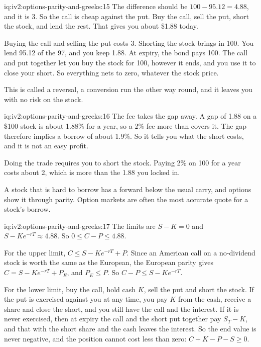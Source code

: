 \begin{solution}{iq:iv2:options-parity-and-greeks:15}
The difference should be $100 - 95.12 = 4.88$, and it is 3. So the call is cheap against the put. Buy the call, sell the put, short the stock, and lend the rest. That gives you about \$1.88 today.

Buying the call and selling the put costs 3. Shorting the stock brings in 100. You lend 95.12 of the 97, and you keep 1.88. At expiry, the bond pays 100. The call and put together let you buy the stock for 100, however it ends, and you use it to close your short. So everything nets to zero, whatever the stock price.

This is called a reversal, a conversion run the other way round, and it leaves you with no risk on the stock.

\end{solution}

\begin{solution}{iq:iv2:options-parity-and-greeks:16}
The fee takes the gap away. A gap of 1.88 on a \$100 stock is about 1.88\% for a year, so a 2\% fee more than covers it. The gap therefore implies a borrow of about 1.9\%. So it tells you what the short costs, and it is not an easy profit.

Doing the trade requires you to short the stock. Paying 2\% on 100 for a year costs about 2, which is more than the 1.88 you locked in.

A stock that is hard to borrow has a forward below the usual carry, and options show it through parity. Option markets are often the most accurate quote for a stock's borrow.

\end{solution}

\begin{solution}{iq:iv2:options-parity-and-greeks:17}
The limits are $S - K = 0$ and $S - Ke^{-rT} \approx 4.88$. So $0 \leq C - P \leq 4.88$.

For the upper limit, $C \leq S - Ke^{-rT} + P$. Since an American call on a no-dividend stock is worth the same as the European, the European parity gives $C = S - Ke^{-rT} + P_E$, and $P_E \leq P$. So $C - P \leq S - Ke^{-rT}$.

For the lower limit, buy the call, hold cash $K$, sell the put and short the stock. If the put is exercised against you at any time, you pay $K$ from the cash, receive a share and close the short, and you still have the call and the interest. If it is never exercised, then at expiry the call and the short put together pay $S_T - K$, and that with the short share and the cash leaves the interest. So the end value is never negative, and the position cannot cost less than zero: $C + K - P - S \geq 0$.

\end{solution}

